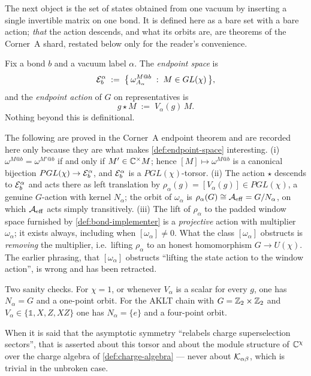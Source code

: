 The next object is the set of states obtained from one vacuum by inserting a
single invertible matrix on one bond. It is defined here as a bare set with a
bare action; \emph{that} the action descends, and what its orbits are, are
theorems of the Corner~A shard, restated below only for the reader's
convenience.

\begin{definition}
\label{def:endpoint-space}
Fix a bond $b$ and a vacuum label $\alpha$. The \emph{endpoint space} is
\begin{equation}
  \mathcal{E}_{b}^{\alpha}
  \; := \; \bigl\{\, \omega_{A_{\alpha}}^{M@b} \;:\; M \in GL(\chi) \,\bigr\},
\end{equation}
and the \emph{endpoint action} of $G$ on representatives is
\begin{equation}
  g \star M \; := \; V_{\alpha}(g) \, M .
\end{equation}
Nothing beyond this is definitional.
\end{definition}

\begin{remark}
\label{rem:endpoint-torsor}
The following are proved in the Corner~A endpoint theorem and are recorded
here only because they are what makes \cref{def:endpoint-space} interesting.
(i) $\omega^{M@b} = \omega^{M'@b}$ if and only if $M' \in \mathbb{C}^{\times} M$;
hence $[M] \mapsto \omega^{M@b}$ is a canonical bijection
$PGL(\chi) \to \mathcal{E}_{b}^{\alpha}$, and $\mathcal{E}_{b}^{\alpha}$ is a
$PGL(\chi)$-torsor. (ii) The action $\star$ descends to $\mathcal{E}_{b}^{\alpha}$
and acts there as left translation by
$\rho_{\alpha}(g) = [V_{\alpha}(g)] \in PGL(\chi)$, a genuine $G$-action with
kernel $N_{\alpha}$; the orbit of $\omega_{\alpha}$ is
$\rho_{\alpha}(G) \cong \mathcal{A}_{\mathrm{eff}} = G/N_{\alpha}$, on which $\mathcal{A}_{\mathrm{eff}}$ acts simply
transitively. (iii) The lift of $\rho_{\alpha}$ to the padded window space
furnished by \cref{def:bond-implementer} is a \emph{projective} action with
multiplier $\omega_{\alpha}$; it exists always, including when
$[\omega_{\alpha}] \neq 0$. What the class $[\omega_{\alpha}]$ obstructs is
\emph{removing} the multiplier, i.e.\ lifting $\rho_{\alpha}$ to an honest
homomorphism $G \to U(\chi)$. The earlier phrasing, that
$[\omega_{\alpha}]$ obstructs ``lifting the state action to the window
action'', is wrong and has been retracted.

Two sanity checks. For $\chi = 1$, or whenever $V_{\alpha}$ is a scalar for
every $g$, one has $N_{\alpha} = G$ and a one-point orbit. For the AKLT chain
with $G = \mathbb{Z}_{2} \times \mathbb{Z}_{2}$ and $V_{\alpha} \in \{\mathbb{1}, X, Z, XZ\}$
one has $N_{\alpha} = \{e\}$ and a four-point orbit.

When it is said that the asymptotic symmetry ``relabels charge superselection
sectors'', that is asserted about this torsor and about the module structure of
$\mathbb{C}^{\chi}$ over the charge algebra of \cref{def:charge-algebra} --- never
about $\mathcal{K}_{\alpha\beta}$, which is trivial in the unbroken case.
\end{remark}

